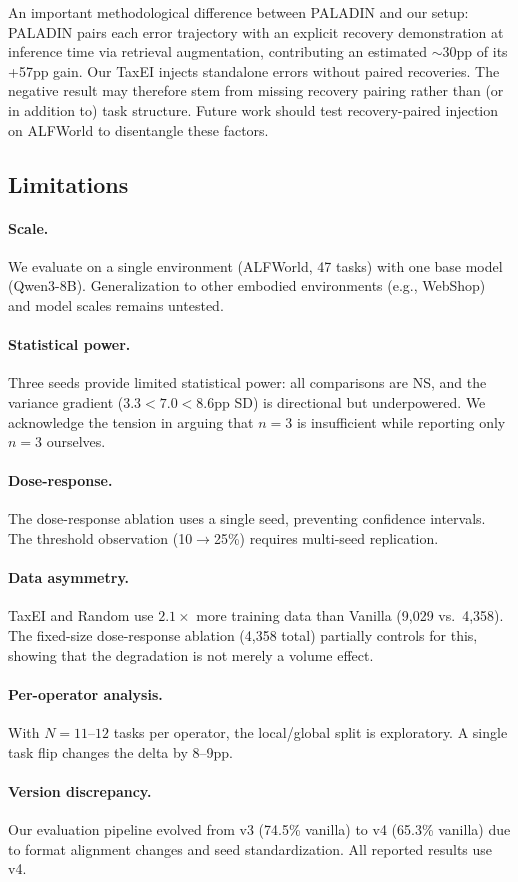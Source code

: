 An important methodological difference between PALADIN and our setup: PALADIN pairs each error trajectory with an explicit recovery demonstration at inference time via retrieval augmentation, contributing an estimated $\sim$30pp of its +57pp gain. Our TaxEI injects standalone errors without paired recoveries. The negative result may therefore stem from missing recovery pairing rather than (or in addition to) task structure. Future work should test recovery-paired injection on ALFWorld to disentangle these factors.

\subsection{Limitations}
\label{sec:limitations}

\paragraph{Scale.} We evaluate on a single environment (ALFWorld, 47 tasks) with one base model (Qwen3-8B). Generalization to other embodied environments (e.g., WebShop) and model scales remains untested.

\paragraph{Statistical power.} Three seeds provide limited statistical power: all comparisons are NS, and the variance gradient ($3.3 < 7.0 < 8.6$pp SD) is directional but underpowered. We acknowledge the tension in arguing that $n{=}3$ is insufficient while reporting only $n{=}3$ ourselves.

\paragraph{Dose-response.} The dose-response ablation uses a single seed, preventing confidence intervals. The threshold observation (10$\to$25\%) requires multi-seed replication.

\paragraph{Data asymmetry.} TaxEI and Random use $2.1\times$ more training data than Vanilla (9{,}029 vs.\ 4{,}358). The fixed-size dose-response ablation (4{,}358 total) partially controls for this, showing that the degradation is not merely a volume effect.

\paragraph{Per-operator analysis.} With $N{=}11$--$12$ tasks per operator, the local/global split is exploratory. A single task flip changes the delta by 8--9pp.

\paragraph{Version discrepancy.} Our evaluation pipeline evolved from v3 (74.5\% vanilla) to v4 (65.3\% vanilla) due to format alignment changes and seed standardization. All reported results use v4.
